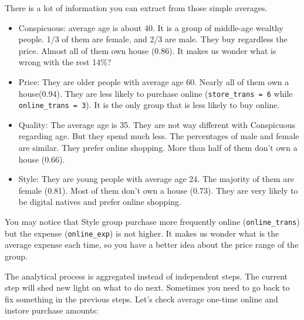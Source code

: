 \documentclass[12pt,]{krantz}
\makeatletter
\newenvironment{Shaded}{\begin{snugshade}}{\end{snugshade}}
\newcommand{\DataTypeTok}[1]{\textcolor[rgb]{0.27,0.27,0.27}{#1}}
\newcommand{\DecValTok}[1]{\textcolor[rgb]{0.06,0.06,0.06}{#1}}
\newcommand{\KeywordTok}[1]{\textcolor[rgb]{0.27,0.27,0.27}{\textbf{#1}}}
\newcommand{\NormalTok}[1]{#1}
\newcommand{\OperatorTok}[1]{\textcolor[rgb]{0.43,0.43,0.43}{\textbf{#1}}}
\newcommand{\StringTok}[1]{\textcolor[rgb]{0.5,0.5,0.5}{#1}}
\newenvironment{kframe}{%
\medskip{}
\setlength{\fboxsep}{.8em}
 \def\at@end@of@kframe{}%
 \ifinner\ifhmode%
  \def\at@end@of@kframe{\end{minipage}}%
  \begin{minipage}{\columnwidth}%
 \fi\fi%
 \def\FrameCommand##1{\hskip\@totalleftmargin \hskip-\fboxsep
 \colorbox{shadecolor}{##1}\hskip-\fboxsep
     \hskip-\linewidth \hskip-\@totalleftmargin \hskip\columnwidth}%
 \MakeFramed {\advance\hsize-\width
   \@totalleftmargin\z@ \linewidth\hsize
   \@setminipage}}%
 {\par\unskip\endMakeFramed%
 \at@end@of@kframe}
\renewenvironment{Shaded}{\begin{kframe}}{\end{kframe}}
\makeatother
\begin{document}
There is a lot of information you can extract from those simple averages.

\begin{itemize}
\item
  Conspicuous: average age is about 40. It is a group of middle-age wealthy people. 1/3 of them are female, and 2/3 are male. They buy regardless the price. Almost all of them own house (0.86). It makes us wonder what is wrong with the rest 14\%?
\item
  Price: They are older people with average age 60. Nearly all of them own a house(0.94). They are less likely to purchase online (\texttt{store\_trans\ =\ 6} while \texttt{online\_trans\ =\ 3}). It is the only group that is less likely to buy online.
\item
  Quality: The average age is 35. They are not way different with Conspicuous regarding age. But they spend much less. The percentages of male and female are similar. They prefer online shopping. More than half of them don't own a house (0.66).
\item
  Style: They are young people with average age 24. The majority of them are female (0.81). Most of them don't own a house (0.73). They are very likely to be digital natives and prefer online shopping.
\end{itemize}

You may notice that Style group purchase more frequently online (\texttt{online\_trans}) but the expense (\texttt{online\_exp}) is not higher. It makes us wonder what is the average expense each time, so you have a better idea about the price range of the group.

The analytical process is aggregated instead of independent steps. The current step will shed new light on what to do next. Sometimes you need to go back to fix something in the previous steps. Let's check average one-time online and instore purchase amounts:

\begin{Shaded}
\end{Shaded}
\end{document}

